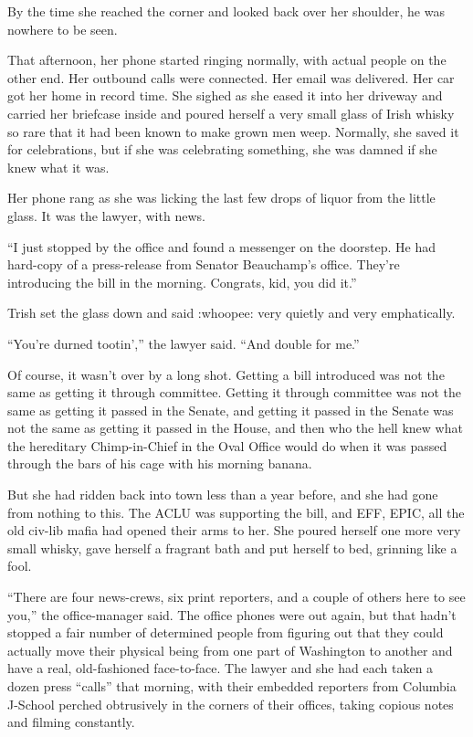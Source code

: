 By the time she reached the corner and looked back over her shoulder, 
he was nowhere to be seen.

\tb

That afternoon, her phone started ringing normally, with actual people 
on the other end. Her outbound calls were connected. Her email was 
delivered. Her car got her home in record time. She sighed as she eased 
it into her driveway and carried her briefcase inside and poured 
herself a very small glass of Irish whisky so rare that it had been 
known to make grown men weep. Normally, she saved it for celebrations, 
but if she was celebrating something, she was damned if she knew what 
it was.

Her phone rang as she was licking the last few drops of liquor from the 
little glass. It was the lawyer, with news.

“I just stopped by the office and found a messenger on the doorstep. 
He had hard-copy of a press-release from Senator Beauchamp's office. 
They're introducing the bill in the morning. Congrats, kid, you did 
it.”

Trish set the glass down and said :whoopee: very quietly and very 
emphatically.

“You're durned tootin',” the lawyer said. “And double for me.”

Of course, it wasn't over by a long shot. Getting a bill introduced was 
not the same as getting it through committee. Getting it through 
committee was not the same as getting it passed in the Senate, and 
getting it passed in the Senate was not the same as getting it passed 
in the House, and then who the hell knew what the hereditary 
Chimp-in-Chief in the Oval Office would do when it was passed through 
the bars of his cage with his morning banana.

But she had ridden back into town less than a year before, and she had 
gone from nothing to this. The ACLU was supporting the bill, and EFF, 
EPIC, all the old civ-lib mafia had opened their arms to her. She 
poured herself one more very small whisky, gave herself a fragrant bath 
and put herself to bed, grinning like a fool.

\tb

“There are four news-crews, six print reporters, and a couple of 
others here to see you,” the office-manager said. The office phones 
were out again, but that hadn't stopped a fair number of determined 
people from figuring out that they could actually move their physical 
being from one part of Washington to another and have a real, 
old-fashioned face-to-face. The lawyer and she had each taken a dozen 
press “calls” that morning, with their embedded reporters from 
Columbia J-School perched obtrusively in the corners of their offices, 
taking copious notes and filming constantly.

